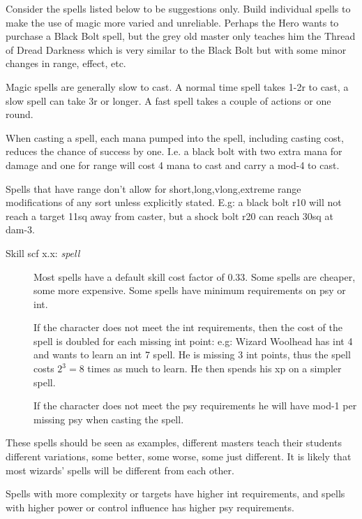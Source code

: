Consider the spells listed below to be suggestions only. Build individual spells to make the use of magic more varied and unreliable. Perhaps the Hero wants to purchase a Black Bolt spell, but the grey old master only teaches him the Thread of Dread Darkness which is very similar to the Black Bolt but with some minor changes in range, effect, etc.

Magic spells are generally slow to cast. A normal time spell takes 1-2r to cast, a slow spell can take 3r or longer. A fast spell takes a couple of actions or one round.

When casting a spell, each mana pumped into the spell, including casting cost, reduces the chance of success by one. I.e. a black bolt with two extra mana for damage and one for range will cost 4 mana to cast and carry a mod-4 to cast.

Spells that have range don't allow for short,long,vlong,extreme range modifications of any sort unless explicitly stated. E.g: a black bolt r10 will not reach a target 11sq away from caster, but a shock bolt r20 can reach 30sq at dam-3.


\begin{description}

\item[Skill scf x.x: \emph{spell}] Most spells have a default skill cost factor of 0.33. Some spells are cheaper, some more expensive. Some spells have minimum requirements on psy or int. 

If the character does not meet the int requirements, then the cost of the spell is doubled for each missing int point: e.g: Wizard Woolhead has int 4 and wants to learn an int 7 spell. He is missing 3 int points, thus the spell costs $2^3=8$ times as much to learn. He then spends his xp on a simpler spell.

If the character does not meet the psy requirements he will have mod-1 per missing psy when casting the spell.

\end{description}

These spells should be seen as examples, different masters teach their students different variations, some better, some worse, some just different. It is likely that most wizards' spells will be different from each other.

Spells with more complexity or targets have higher int requirements, and spells with higher power or control influence has higher psy requirements.


